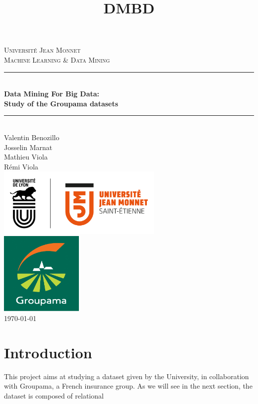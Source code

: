 \documentclass[a4paper, 11pt]{article}
\title{DMBD}
\newcommand{\HRule}{\rule{\linewidth}{0.5mm}}
\begin{document}
\thispagestyle{empty}
	\vspace{2cm}
	\begin{center}
		\LARGE{\textsc{Université Jean Monnet}}\\[1cm]
		\Large{\textsc{Machine Learning \& Data Mining}} \\[0.5cm]
		\HRule \\[0.5cm]
		{ \huge \bfseries Data Mining For Big Data:\\[.5em]Study of the Groupama datasets}\\[0.4cm]
		\HRule \\[1cm]
        Valentin Benozillo \\
        Josselin Marnat \\
        Mathieu Viola \\
        Rémi Viola \\
		\normalsize
		\vfill
        \includegraphics[width=8cm]{Img/UJM.png} \\[1cm]
        \includegraphics[width=4cm]{Img/groupama.jpg} \\[1cm]
		\vfill
        \today
	\end{center}
	\newpage

\newpage



\tableofcontents

\newpage
\section{Introduction} %
	This project aims at studying a dataset given by the University, in collaboration with Groupama, a French insurance group. As we will see in the next section, the dataset is composed of relational 
\end{document}
